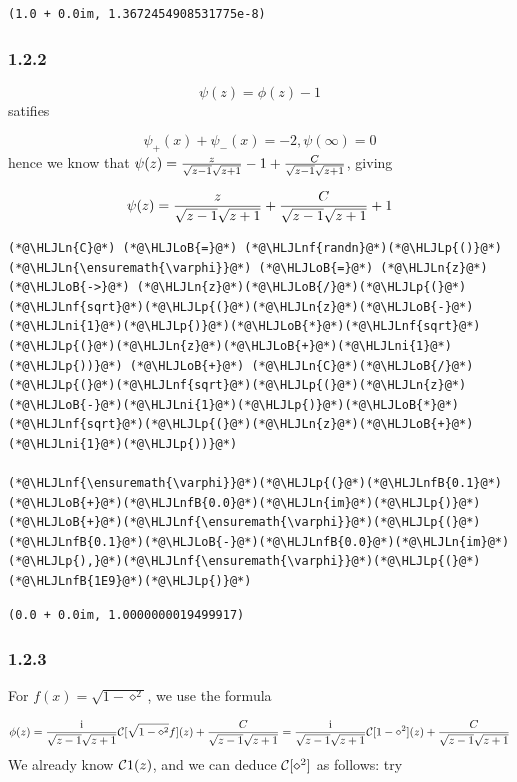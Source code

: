 \documentclass[12pt,a4paper]{article}
\newcommand{\HLJLn}[1]{#1}
\newcommand{\HLJLnf}[1]{\textcolor[RGB]{66,102,213}{#1}}
\newcommand{\HLJLnfB}[1]{\textcolor[RGB]{59,151,46}{#1}}
\newcommand{\HLJLni}[1]{\textcolor[RGB]{59,151,46}{#1}}
\newcommand{\HLJLoB}[1]{\textcolor[RGB]{102,102,102}{\textbf{#1}}}
\newcommand{\HLJLp}[1]{#1}
\def\I{ {\rm i} }
\def\CC{ {\cal C} }
\begin{document}
\begin{lstlisting}
(1.0 + 0.0im, 1.3672454908531775e-8)
\end{lstlisting}


\subsubsection{1.2.2}
\[
\psi(z) = \phi(z) - 1
\]
satifies 

\[
\psi_+(x) + \psi_-(x) = -2, \psi(\infty) = 0
\]
hence we know that $\psi(z) = { z  \over  \sqrt{z -1} \sqrt{z+1}} - 1 + {C \over \sqrt{z-1} \sqrt{z+1}}$, giving 

\[
\psi(z) = { z  \over  \sqrt{z -1} \sqrt{z+1}} + {C \over \sqrt{z-1} \sqrt{z+1}} + 1
\]

\begin{lstlisting}
(*@\HLJLn{C}@*) (*@\HLJLoB{=}@*) (*@\HLJLnf{randn}@*)(*@\HLJLp{()}@*)
(*@\HLJLn{\ensuremath{\varphi}}@*) (*@\HLJLoB{=}@*) (*@\HLJLn{z}@*) (*@\HLJLoB{->}@*) (*@\HLJLn{z}@*)(*@\HLJLoB{/}@*)(*@\HLJLp{(}@*)(*@\HLJLnf{sqrt}@*)(*@\HLJLp{(}@*)(*@\HLJLn{z}@*)(*@\HLJLoB{-}@*)(*@\HLJLni{1}@*)(*@\HLJLp{)}@*)(*@\HLJLoB{*}@*)(*@\HLJLnf{sqrt}@*)(*@\HLJLp{(}@*)(*@\HLJLn{z}@*)(*@\HLJLoB{+}@*)(*@\HLJLni{1}@*)(*@\HLJLp{))}@*) (*@\HLJLoB{+}@*) (*@\HLJLn{C}@*)(*@\HLJLoB{/}@*)(*@\HLJLp{(}@*)(*@\HLJLnf{sqrt}@*)(*@\HLJLp{(}@*)(*@\HLJLn{z}@*)(*@\HLJLoB{-}@*)(*@\HLJLni{1}@*)(*@\HLJLp{)}@*)(*@\HLJLoB{*}@*)(*@\HLJLnf{sqrt}@*)(*@\HLJLp{(}@*)(*@\HLJLn{z}@*)(*@\HLJLoB{+}@*)(*@\HLJLni{1}@*)(*@\HLJLp{))}@*) 

(*@\HLJLnf{\ensuremath{\varphi}}@*)(*@\HLJLp{(}@*)(*@\HLJLnfB{0.1}@*)(*@\HLJLoB{+}@*)(*@\HLJLnfB{0.0}@*)(*@\HLJLn{im}@*)(*@\HLJLp{)}@*)(*@\HLJLoB{+}@*)(*@\HLJLnf{\ensuremath{\varphi}}@*)(*@\HLJLp{(}@*)(*@\HLJLnfB{0.1}@*)(*@\HLJLoB{-}@*)(*@\HLJLnfB{0.0}@*)(*@\HLJLn{im}@*)(*@\HLJLp{),}@*)(*@\HLJLnf{\ensuremath{\varphi}}@*)(*@\HLJLp{(}@*)(*@\HLJLnfB{1E9}@*)(*@\HLJLp{)}@*)
\end{lstlisting}

\begin{lstlisting}
(0.0 + 0.0im, 1.0000000019499917)
\end{lstlisting}


\subsubsection{1.2.3}
For $f(x) = \sqrt{1-\diamond^2}$, we use the formula

\[
\phi(z) = {\I \over \sqrt{z - 1} \sqrt{z+1}} \CC[\sqrt{1-\diamond^2} f](z) + {C \over \sqrt{z-1}\sqrt{z+1}}  = {\I \over \sqrt{z - 1} \sqrt{z+1}} \CC[1-\diamond^2](z) + {C \over \sqrt{z-1}\sqrt{z+1}}
\]
We already know $\CC1(z)$, and we can deduce $\CC[\diamond^2]$ as follows: try
\end{document}
